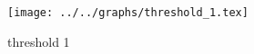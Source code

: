 \begin{figure}[h] \centering\texttt{[image: ../../graphs/threshold\_1.tex]}\caption{threshold 1}\label{gr:threshold_1} \end{figure}
